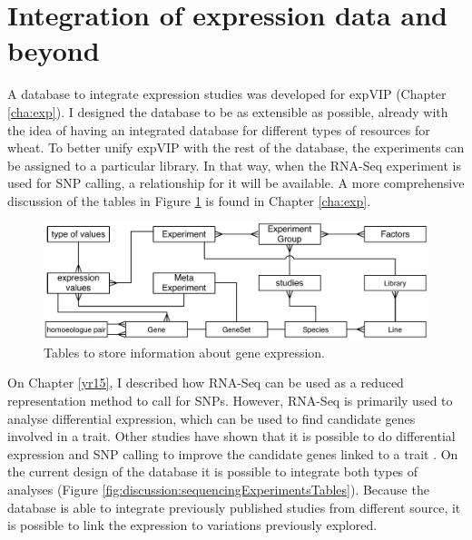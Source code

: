 \section{Integration of expression data and beyond}

A database to integrate expression studies was developed for expVIP (Chapter \ref{cha:exp}). 
I designed the database to be as extensible as possible, already with the idea of having an integrated database for different types of resources for wheat. 
To better unify expVIP with the rest of the database, the experiments can be assigned to a particular library. 
In that way, when the RNA-Seq experiment is used for SNP calling, a relationship for it will be available. 
A more comprehensive discussion of the tables in Figure \ref{fig:discussion:expressionTables} is found in Chapter \ref{cha:exp}. 

\begin{figure}
\includegraphics[width=1\textwidth]{Conclusions/Figures/ExpressionTables.pdf}
\caption{Tables to store information about gene expression.}
\label{fig:discussion:expressionTables}
\end{figure}

On Chapter \ref{yr15}, I described how RNA-Seq can be used as a reduced representation method to call for SNPs. 
However, RNA-Seq is primarily used to analyse differential expression, which can be used to find candidate genes involved in a trait.
Other studies have shown that it is possible to do differential expression and SNP calling to improve the candidate genes linked to a trait \citep{Lopez-Maestre2016}.
On the current design of the database it is possible to integrate both types of analyses (Figure \ref{fig:discussion:sequencingExperimentsTables}). 
Because the database is able to integrate previously published studies from different source, it is possible to link the expression to variations previously explored. 

